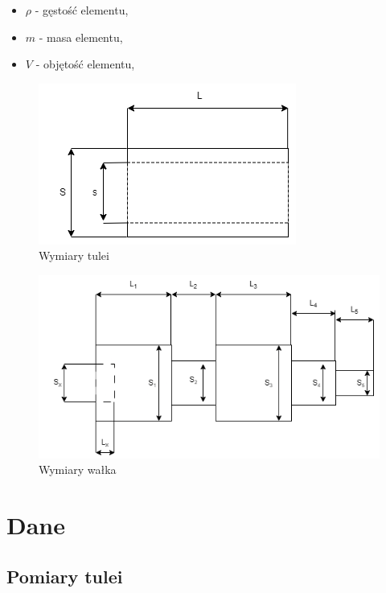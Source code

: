 \documentclass[11pt]{article}
\begin{document}
    {
        \footnotesize
        \begin{itemize}
            \setlength\itemsep{0.1em}
            \item[] $\rho$ - gęstość elementu,
            \item[] $m$ - masa elementu,
            \item[] $V$ - objętość elementu,
        \end{itemize}
    }
    \begin{figure}
        \centerline{\includegraphics[scale=.6]{tuleja.drawio.png}}
        \caption*{Wymiary tulei}
    \end{figure}
    \begin{figure}
        \centerline{\includegraphics[scale=.6]{walek.png}}
        \caption*{Wymiary wałka}
    \end{figure}

    \newpage
    \section{Dane}

    \subsection{Pomiary tulei}
    \begin{center}
    \end{center}
\end{document}
